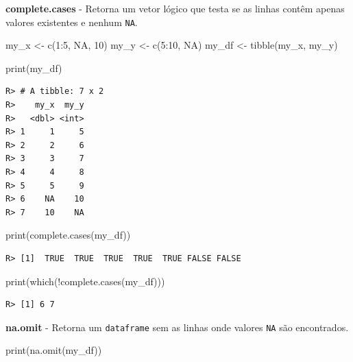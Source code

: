 \documentclass[
  11pt,
]{book}
\newenvironment{Shaded}{\begin{snugshade}}{\end{snugshade}}
\newcommand{\ConstantTok}[1]{\textcolor[rgb]{0,0,0}{#1}}
\newcommand{\DecValTok}[1]{\textcolor[rgb]{0.06,0.06,0.06}{#1}}
\newcommand{\FunctionTok}[1]{\textcolor[rgb]{0,0,0}{#1}}
\newcommand{\NormalTok}[1]{#1}
\newcommand{\OtherTok}[1]{\textcolor[rgb]{0.37,0.37,0.37}{#1}}
\newcommand{\SpecialCharTok}[1]{\textcolor[rgb]{0,0,0}{#1}}
\begin{document}
\textbf{complete.cases} - Retorna um vetor lógico que testa se as linhas contêm apenas valores existentes e nenhum \texttt{NA}.

\begin{Shaded}
\begin{Highlighting}[]
\NormalTok{my\_x }\OtherTok{\textless{}{-}} \FunctionTok{c}\NormalTok{(}\DecValTok{1}\SpecialCharTok{:}\DecValTok{5}\NormalTok{, }\ConstantTok{NA}\NormalTok{, }\DecValTok{10}\NormalTok{)}
\NormalTok{my\_y }\OtherTok{\textless{}{-}} \FunctionTok{c}\NormalTok{(}\DecValTok{5}\SpecialCharTok{:}\DecValTok{10}\NormalTok{, }\ConstantTok{NA}\NormalTok{)}
\NormalTok{my\_df }\OtherTok{\textless{}{-}} \FunctionTok{tibble}\NormalTok{(my\_x, my\_y)}

\FunctionTok{print}\NormalTok{(my\_df)}
\end{Highlighting}
\end{Shaded}

\begin{verbatim}
R> # A tibble: 7 x 2
R>    my_x  my_y
R>   <dbl> <int>
R> 1     1     5
R> 2     2     6
R> 3     3     7
R> 4     4     8
R> 5     5     9
R> 6    NA    10
R> 7    10    NA
\end{verbatim}

\begin{Shaded}
\begin{Highlighting}[]
\FunctionTok{print}\NormalTok{(}\FunctionTok{complete.cases}\NormalTok{(my\_df))}
\end{Highlighting}
\end{Shaded}

\begin{verbatim}
R> [1]  TRUE  TRUE  TRUE  TRUE  TRUE FALSE FALSE
\end{verbatim}

\begin{Shaded}
\begin{Highlighting}[]
\FunctionTok{print}\NormalTok{(}\FunctionTok{which}\NormalTok{(}\SpecialCharTok{!}\FunctionTok{complete.cases}\NormalTok{(my\_df)))}
\end{Highlighting}
\end{Shaded}

\begin{verbatim}
R> [1] 6 7
\end{verbatim}

\textbf{na.omit} - Retorna um \texttt{dataframe} sem as linhas onde valores \texttt{NA} são encontrados.

\begin{Shaded}
\begin{Highlighting}[]
\FunctionTok{print}\NormalTok{(}\FunctionTok{na.omit}\NormalTok{(my\_df))}
\end{Highlighting}
\end{Shaded}
\end{document}

